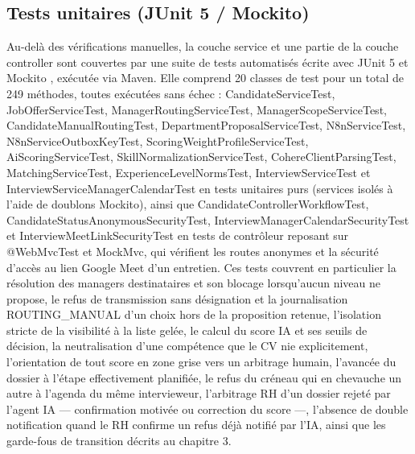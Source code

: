 \subsection{Tests unitaires (JUnit 5 / Mockito)}
\label{sec_4_4_1}
Au-delà des vérifications manuelles, la couche service et une partie de la couche controller sont couvertes par une suite de tests automatisés écrite avec JUnit 5 et Mockito \cite{ref16,ref24}, exécutée via Maven. Elle comprend 20 classes de test pour un total de 249 méthodes, toutes exécutées sans échec : Candidate\allowbreak Service\allowbreak Test, Job\allowbreak Offer\allowbreak Service\allowbreak Test, Manager\allowbreak Routing\allowbreak Service\allowbreak Test, Manager\allowbreak Scope\allowbreak Service\allowbreak Test, Candidate\allowbreak Manual\allowbreak Routing\allowbreak Test, Department\allowbreak Proposal\allowbreak Service\allowbreak Test, N8nServiceTest, N8n\allowbreak Service\allowbreak Outbox\allowbreak Key\allowbreak Test, Scoring\allowbreak Weight\allowbreak Profile\allowbreak Service\allowbreak Test, Ai\allowbreak Scoring\allowbreak Service\allowbreak Test, Skill\allowbreak Normalization\allowbreak Service\allowbreak Test, Cohere\allowbreak Client\allowbreak Parsing\allowbreak Test, Matching\allowbreak Service\allowbreak Test, Experience\allowbreak Level\allowbreak Norms\allowbreak Test, Interview\allowbreak Service\allowbreak Test et Interview\allowbreak Service\allowbreak Manager\allowbreak Calendar\allowbreak Test en tests unitaires purs (services isolés à l’aide de doublons Mockito), ainsi que Candidate\allowbreak Controller\allowbreak Workflow\allowbreak Test, Candidate\allowbreak Status\allowbreak Anonymous\allowbreak Security\allowbreak Test, Interview\allowbreak Manager\allowbreak Calendar\allowbreak Security\allowbreak Test et Interview\allowbreak Meet\allowbreak Link\allowbreak Security\allowbreak Test en tests de contrôleur reposant sur @WebMvcTest et MockMvc, qui vérifient les routes anonymes et la sécurité d’accès au lien Google Meet d’un entretien. Ces tests couvrent en particulier la résolution des managers destinataires et son blocage lorsqu’aucun niveau ne propose, le refus de transmission sans désignation et la journalisation ROUTING\_MANUAL d’un choix hors de la proposition retenue, l’isolation stricte de la visibilité à la liste gelée, le calcul du score IA et ses seuils de décision, la neutralisation d’une compétence que le CV nie explicitement, l’orientation de tout score en zone grise vers un arbitrage humain, l’avancée du dossier à l’étape effectivement planifiée, le refus du créneau qui en chevauche un autre à l’agenda du même intervieweur, l’arbitrage RH d’un dossier rejeté par l’agent IA — confirmation motivée ou correction du score —, l’absence de double notification quand le RH confirme un refus déjà notifié par l’IA, ainsi que les garde-fous de transition décrits au chapitre 3.

